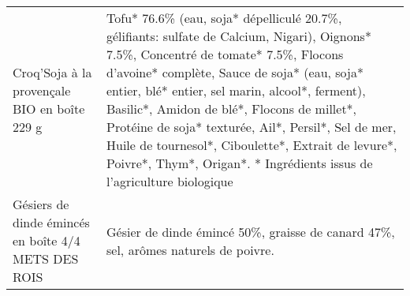 \begin{longtable}{p{5cm}p{10cm}}
                                                             Croq'Soja à la provençale BIO en boîte 229 g &                                                                                                                                                                                                                                                                                                                                                                                                                                                                                                                                                             Tofu* 76.6\% (eau, soja* dépelliculé 20.7\%, gélifiants: sulfate de Calcium, Nigari), Oignons* 7.5\%, Concentré de tomate* 7.5\%, Flocons d'avoine* complète, Sauce de soja* (eau, soja* entier, blé* entier, sel marin, alcool*, ferment), Basilic*, Amidon de blé*, Flocons de millet*, Protéine de soja* texturée, Ail*, Persil*, Sel de mer, Huile de tournesol*, Ciboulette*, Extrait de levure*, Poivre*, Thym*, Origan*.  * Ingrédients issus de l'agriculture biologique \\
                                                      Gésiers de dinde émincés en boîte 4/4 METS DES ROIS &                                                                                                                                                                                                                                                                                                                                                                                                                                                                                                                                                                                                                                                                                                                                                                                                                                                                                                                                                       Gésier de dinde émincé 50\%, graisse de canard 47\%, sel, arômes naturels de poivre. \\

\end{longtable}
